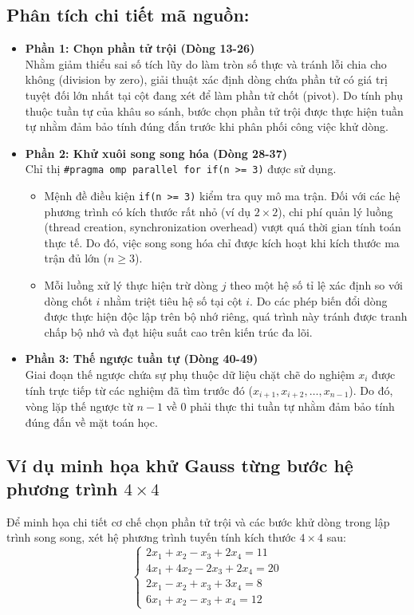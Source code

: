 \subsection*{Phân tích chi tiết mã nguồn:}
\begin{itemize}
    \item \textbf{Phần 1: Chọn phần tử trội (Dòng 13-26)} \\
          Nhằm giảm thiểu sai số tích lũy do làm tròn số thực và tránh lỗi chia cho không (division by zero), giải thuật xác định dòng chứa phần tử có giá trị tuyệt đối lớn nhất tại cột đang xét để làm phần tử chốt (pivot). Do tính phụ thuộc tuần tự của khâu so sánh, bước chọn phần tử trội được thực hiện tuần tự nhằm đảm bảo tính đúng đắn trước khi phân phối công việc khử dòng.
    \item \textbf{Phần 2: Khử xuôi song song hóa (Dòng 28-37)} \\
          Chỉ thị \texttt{\#pragma omp parallel for if(n >= 3)} được sử dụng.
          \begin{itemize}
              \item Mệnh đề điều kiện \texttt{if(n >= 3)} kiểm tra quy mô ma trận. Đối với các hệ phương trình có kích thước rất nhỏ (ví dụ $2 \times 2$), chi phí quản lý luồng (thread creation, synchronization overhead) vượt quá thời gian tính toán thực tế. Do đó, việc song song hóa chỉ được kích hoạt khi kích thước ma trận đủ lớn ($n \ge 3$).
              \item Mỗi luồng xử lý thực hiện trừ dòng $j$ theo một hệ số tỉ lệ xác định so với dòng chốt $i$ nhằm triệt tiêu hệ số tại cột $i$. Do các phép biến đổi dòng được thực hiện độc lập trên bộ nhớ riêng, quá trình này tránh được tranh chấp bộ nhớ và đạt hiệu suất cao trên kiến trúc đa lõi.
          \end{itemize}
    \item \textbf{Phần 3: Thế ngược tuần tự (Dòng 40-49)} \\
          Giai đoạn thế ngược chứa sự phụ thuộc dữ liệu chặt chẽ do nghiệm $x_i$ được tính trực tiếp từ các nghiệm đã tìm trước đó ($x_{i+1}, x_{i+2}, \dots, x_{n-1}$). Do đó, vòng lặp thế ngược từ $n-1$ về $0$ phải thực thi tuần tự nhằm đảm bảo tính đúng đắn về mặt toán học.
\end{itemize}

\subsection{Ví dụ minh họa khử Gauss từng bước hệ phương trình $4 \times 4$}
Để minh họa chi tiết cơ chế chọn phần tử trội và các bước khử dòng trong lập trình song song, xét hệ phương trình tuyến tính kích thước $4 \times 4$ sau:
\begin{equation*}
    \begin{cases}
        2x_1 + x_2 - x_3 + 2x_4 = 11   \\
        4x_1 + 4x_2 - 2x_3 + 2x_4 = 20 \\
        2x_1 - x_2 + x_3 + 3x_4 = 8    \\
        6x_1 + x_2 - x_3 + x_4 = 12
    \end{cases}
\end{equation*}

